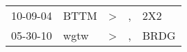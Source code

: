 \begin{supertabular}{p{0.07\textwidth}p{0.06\textwidth}p{0.02\textwidth}p{0.02\textwidth}p{0.06\textwidth}}
 10-09-04\textsuperscript{} &  BTTM\textsuperscript{} &  \textgreater &  , &   2X2\textsuperscript{} \\
 05-30-10\textsuperscript{} &  wgtw\textsuperscript{} &  \textgreater &  , &  BRDG\textsuperscript{} \\
\end{supertabular}
